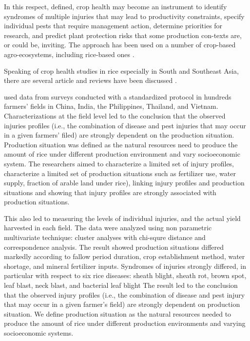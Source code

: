 In this respect, defined, crop health may become an instrument to identify syndromes of multiple injuries that may lead to productivity constraints, specify individual pests that require management action, determine priorities for research, and predict plant protection risks that some production con-texts are, or could be, inviting. The approach has been used on a number of crop-based agro-ecosystems, including rice-based ones \citep{Savary:2006to}.

Speaking of crop health studies in rice especially in South and Southeast Asia, there are several article and reviews have been discussed \cite{savary2005multiple, Savary:2006to, Savary:2000vr, reddy2011characterizing, dong2010characterization}. 

\cite{Savary:2000vr} used data from surveys conducted with a standardized protocol in hundreds farmers’ fields in China, India, the Philippines, Thailand, and Vietnam. Characterizations at the field level led to the conclusion that the observed injuries profiles (i.e., the combination of disease and pest injuries that may occur in a given farmers’ filed) are strongly dependent on the production situation. Production situation was defined as the natural resources need to produce the amount of rice under different production environment and vary socioeconomic system. The researchers aimed to characterize a limited set of injury profiles, characterize a limited set of production situations such as fertilizer use, water supply, fraction of arable land under rice), linking injury profiles and production situations and showing that injury profiles are strongly associated with production situations. 

This also led to measuring the levels of individual injuries, and the actual yield harvested in each field. The data were analyzed using non parametric multivariate technique: cluster analyses with chi-squre distance and correspondence analysis. The result showed production situations differed markedly according to fallow period duration, crop establishment method, water shortage, and mineral fertilizer inputs. Syndromes of injuries strongly differed, in particular with respect to six rice diseases: sheath blight, sheath rot, brown spot, leaf blast, neck blast, and bacterial leaf blight The result led to the conclusion that the observed injury profiles (i.e., the combination of disease and pest injury that may occur in a given farmer’s field) are strongly dependent on production situation. We define production situation as the natural resources needed to produce the amount of rice under different production environments and varying socioeconomic systems.

